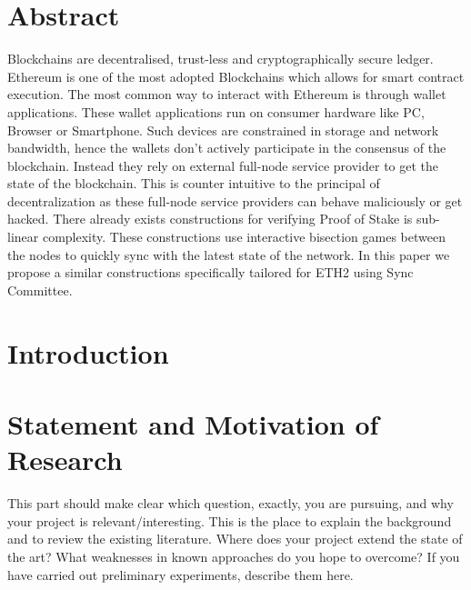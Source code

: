 \documentclass[a4paper,11pt,oneside]{article}
\begin{document}
  \section*{Abstract}
  Blockchains are decentralised, trust-less and cryptographically secure ledger.  Ethereum is one of the most adopted Blockchains which allows for smart contract execution. The most common way to interact with Ethereum is through wallet applications. These wallet applications run on consumer hardware like PC, Browser or Smartphone. Such devices are constrained in storage and network bandwidth, hence the wallets don't actively participate in the consensus of the blockchain.  Instead they rely on external full-node service provider to get the state of the blockchain. This is counter intuitive to the principal of decentralization as these full-node service providers can behave maliciously or get hacked. There already exists constructions for verifying Proof of Stake is sub-linear complexity. These constructions use interactive bisection games between the nodes to quickly sync with the latest state of the network. In this paper we propose a similar constructions specifically tailored for ETH2 using Sync Committee.

  \newpage
  \tableofcontents

  \clearpage

  \section{Introduction}

 
  

  \section{Statement and Motivation of Research}

  This part should make clear which question, exactly, you are
  pursuing, and why your project is relevant/interesting. This is the
  place to explain the background and to review the existing
  literature. Where does your project extend the state of the art?
  What weaknesses in known approaches do you hope to overcome? If you
  have carried out preliminary experiments, describe them here.
\end{document}
